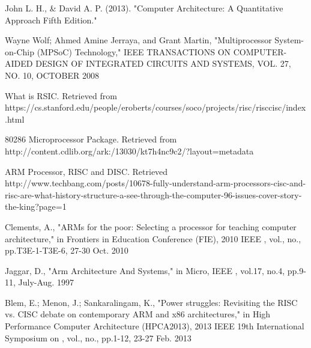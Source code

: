 \documentclass[conference]{IEEEtran}
\begin{document}
%
%
%
\begin{thebibliography}{1}

John L. H., \& David A. P. (2013). "Computer Architecture: A Quantitative Approach Fifth Edition."

Wayne Wolf; Ahmed Amine Jerraya, and Grant Martin, "Multiprocessor System-on-Chip
(MPSoC) Technology," IEEE TRANSACTIONS ON COMPUTER-AIDED DESIGN OF INTEGRATED CIRCUITS AND SYSTEMS, VOL. 27, NO. 10, OCTOBER 2008

What is RSIC. Retrieved from https://cs.stanford.edu/people/eroberts/courses/soco/projects/risc/risccisc/index.html

80286 Microprocessor Package. Retrieved from http://content.cdlib.org/ark:/13030/kt7h4nc9c2/?layout=metadata

ARM Processor, RISC and DISC. Retrieved http://www.techbang.com/posts/10678-fully-understand-arm-processors-cisc-and-risc-are-what-history-structure-a-see-through-the-computer-96-issues-cover-story-the-king?page=1

Clements, A., "ARMs for the poor: Selecting a processor for teaching computer architecture," in Frontiers in Education Conference (FIE), 2010 IEEE , vol., no., pp.T3E-1-T3E-6, 27-30 Oct. 2010

Jaggar, D., "Arm Architecture And Systems," in Micro, IEEE , vol.17, no.4, pp.9-11, July-Aug. 1997

Blem, E.; Menon, J.; Sankaralingam, K., "Power struggles: Revisiting the RISC vs. CISC debate on contemporary ARM and x86 architectures," in High Performance Computer Architecture (HPCA2013), 2013 IEEE 19th International Symposium on , vol., no., pp.1-12, 23-27 Feb. 2013

\end{thebibliography}




\end{document}
